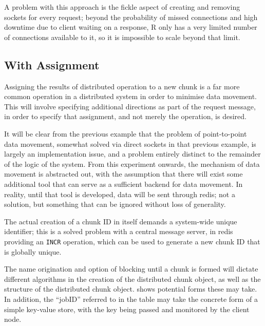 A problem with this approach is the fickle aspect of creating and
removing sockets for every request; beyond the probability of missed
connections and high downtime due to client waiting on a response, R
only has a very limited number of connections available to it, so it is
impossible to scale beyond that limit.

\hypertarget{with-assignment}{%
\subsection{With Assignment}\label{with-assignment}}

Assigning the results of distributed operation to a new chunk is a far
more common operation in a distributed system in order to minimise data
movement. This will involve specifying additional directions as part of
the request message, in order to specify that assignment, and not merely
the operation, is desired.

It will be clear from the previous example that the problem of
point-to-point data movement, somewhat solved via direct sockets in that
previous example, is largely an implementation issue, and a problem
entirely distinct to the remainder of the logic of the system. From this
experiment onwards, the mechanism of data movement is abstracted out,
with the assumption that there will exist some additional tool that can
serve as a sufficient backend for data movement. In reality, until that
tool is developed, data will be sent through redis; not a solution, but
something that can be ignored without loss of generality.

The actual creation of a chunk ID in itself demands a system-wide unique
identifier; this is a solved problem with a central message server, in
redis providing an \texttt{INCR} operation, which can be used to
generate a new chunk ID that is globally unique.

The name origination and option of blocking until a chunk is formed will
dictate different algorithms in the creation of the distributed chunk
object, as well as the structure of the distributed chunk object.
\cite{tbl:name-orig-block} shows potential forms these may take. In
addition, the ``jobID'' referred to in the table may take the concrete
form of a simple key-value store, with the key being passed and
monitored by the client node.

